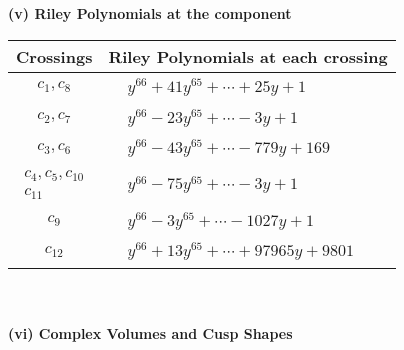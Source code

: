 \documentclass[1p]{elsarticle_modified}
\theoremstyle{definition}
\begin{document}
\newpage\renewcommand{\arraystretch}{1}
\flushleft \textbf{(v) Riley Polynomials at the component}\newline \\
\begin{tabular}{m{50pt}|m{274pt}}
Crossings & \hspace{64pt}Riley Polynomials at each crossing \\
\hline $$\begin{aligned}c_{1},c_{8}\end{aligned}$$&$\begin{aligned}
&y^{66}+41 y^{65}+\cdots+25 y+1
\end{aligned}$\\
\hline $$\begin{aligned}c_{2},c_{7}\end{aligned}$$&$\begin{aligned}
&y^{66}-23 y^{65}+\cdots-3 y+1
\end{aligned}$\\
\hline $$\begin{aligned}c_{3},c_{6}\end{aligned}$$&$\begin{aligned}
&y^{66}-43 y^{65}+\cdots-779 y+169
\end{aligned}$\\
\hline $$\begin{aligned}c_{4},c_{5},c_{10}\\c_{11}\end{aligned}$$&$\begin{aligned}
&y^{66}-75 y^{65}+\cdots-3 y+1
\end{aligned}$\\
\hline $$\begin{aligned}c_{9}\end{aligned}$$&$\begin{aligned}
&y^{66}-3 y^{65}+\cdots-1027 y+1
\end{aligned}$\\
\hline $$\begin{aligned}c_{12}\end{aligned}$$&$\begin{aligned}
&y^{66}+13 y^{65}+\cdots+97965 y+9801
\end{aligned}$\\
\hline
\end{tabular}\\~\\
\newpage\flushleft \textbf{(vi) Complex Volumes and Cusp Shapes}
\end{document}
